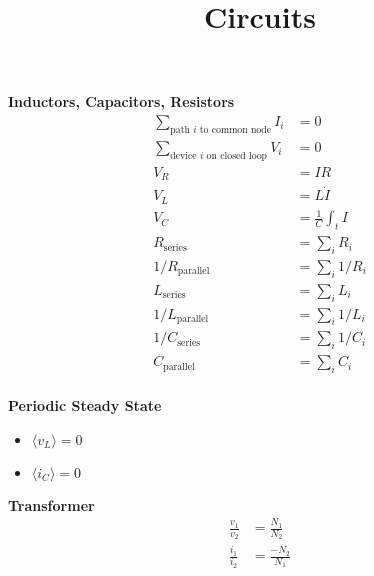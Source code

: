 \documentclass[12pt]{article}
\title{\vspace{-2em}Circuits}
\date{}
\begin{document}
\maketitle

\vspace{-4em}
\begin{multicols}{2}
  \textbf{Inductors, Capacitors, Resistors}
  \begin{align}
    \sum_{\textrm{path $i$ to common node}} I_i &= 0\\
    \sum_{\textrm{device $i$ on closed loop}} V_i &= 0\\
    V_R &= I R\\
    V_L &= L \dot{I}\\
    V_C &= \frac{1}{C} \int_t I\\
    R_{\textrm{series}} &= \sum_i R_i\\
    1/R_{\textrm{parallel}} &= \sum_i 1/R_i\\
    L_{\textrm{series}} &= \sum_i L_i\\
    1/L_{\textrm{parallel}} &= \sum_i 1/L_i\\
    1/C_{\textrm{series}} &= \sum_i 1/C_i\\
    C_{\textrm{parallel}} &= \sum_i C_i\\
  \end{align}

  \textbf{Periodic Steady State}
  \begin{itemize}
    \item $\langle v_L \rangle = 0$
    \item $\langle i_C \rangle = 0$
  \end{itemize}

  \textbf{Transformer}
  \begin{align}
    \frac{v_1}{v_2} &= \frac{N_1}{N_2}\\ %
    \frac{i_1}{i_2} &= \frac{-N_2}{N_1} %
  \end{align}


\end{multicols}
\end{document}
